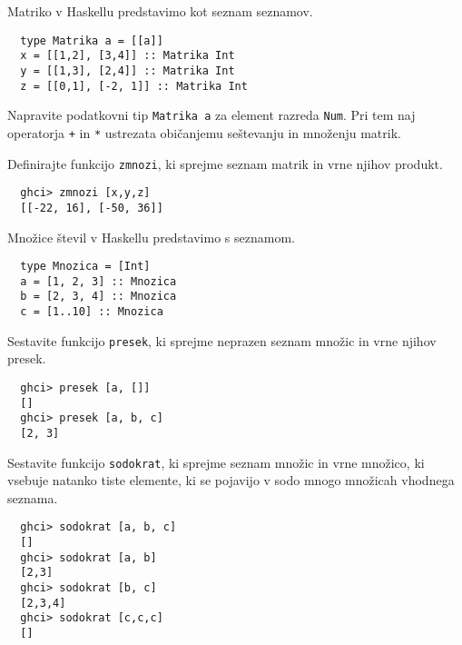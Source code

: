 \documentclass[arhiv]{../izpit}
\begin{document}


Matriko v Haskellu predstavimo kot seznam seznamov.

\begin{verbatim}
  type Matrika a = [[a]]
  x = [[1,2], [3,4]] :: Matrika Int
  y = [[1,3], [2,4]] :: Matrika Int
  z = [[0,1], [-2, 1]] :: Matrika Int
\end{verbatim}

\podnaloga
  Napravite podatkovni tip \texttt{Matrika a} za element razreda \texttt{Num}.
  Pri tem naj operatorja \texttt{+} in \texttt{*} ustrezata običanjemu seštevanju
  in množenju matrik.

\podnaloga
  Definirajte funkcijo \texttt{zmnozi}, ki sprejme seznam matrik in vrne
  njihov produkt.
  \begin{verbatim}
  ghci> zmnozi [x,y,z]
  [[-22, 16], [-50, 36]]
  \end{verbatim}



Množice števil v Haskellu predstavimo s seznamom.

\begin{verbatim}
  type Mnozica = [Int]
  a = [1, 2, 3] :: Mnozica
  b = [2, 3, 4] :: Mnozica
  c = [1..10] :: Mnozica
\end{verbatim}

\podnaloga
  Sestavite funkcijo \texttt{presek}, ki sprejme neprazen seznam množic
  in vrne njihov presek.

  \begin{verbatim}
  ghci> presek [a, []]
  []
  ghci> presek [a, b, c]
  [2, 3]
  \end{verbatim}

\podnaloga
  Sestavite funkcijo \texttt{sodokrat}, ki sprejme seznam množic in vrne
  množico, ki vsebuje natanko tiste elemente, ki se pojavijo v sodo mnogo
  množicah vhodnega seznama.

  \begin{verbatim}
  ghci> sodokrat [a, b, c]
  []
  ghci> sodokrat [a, b]
  [2,3]
  ghci> sodokrat [b, c]
  [2,3,4]
  ghci> sodokrat [c,c,c]
  []
  \end{verbatim}
\end{document}
